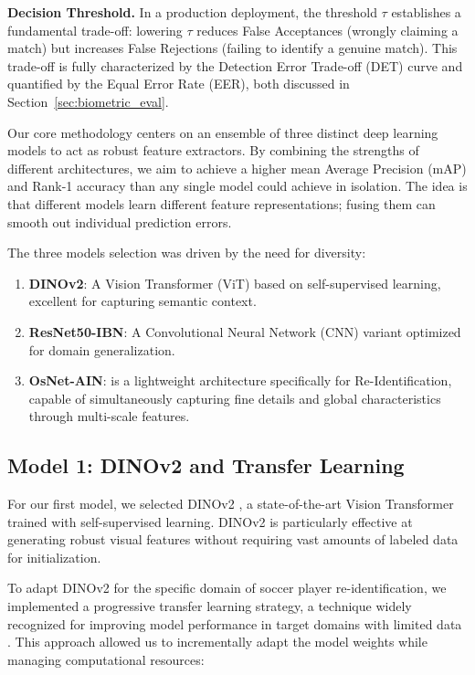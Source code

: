 \documentclass[10pt,twocolumn,letterpaper]{article}
\begin{document}
\textbf{Decision Threshold.} In a production deployment, the threshold $\tau$ establishes a fundamental trade-off: lowering $\tau$ reduces False Acceptances (wrongly claiming a match) but increases False Rejections (failing to identify a genuine match). This trade-off is fully characterized by the Detection Error Trade-off (DET) curve and quantified by the Equal Error Rate (EER), both discussed in Section~\ref{sec:biometric_eval}.

Our core methodology centers on an ensemble of three distinct deep learning models to act as robust feature extractors. By combining the strengths of different architectures, we aim to achieve a higher mean Average Precision (mAP) and Rank-1 accuracy than any single model could achieve in isolation. The idea is that different models learn different feature representations; fusing them can smooth out individual prediction errors.

The three models selection was driven by the need for diversity:
\begin{enumerate}
    \item \textbf{DINOv2}: A Vision Transformer (ViT) based on self-supervised learning, excellent for capturing semantic context.
    \item \textbf{ResNet50-IBN}: A Convolutional Neural Network (CNN) variant optimized for domain generalization.
    \item \textbf{OsNet-AIN}: is a lightweight architecture specifically for Re-Identification, capable of simultaneously capturing fine details and global characteristics through multi-scale features.
\end{enumerate}

\subsection{Model 1: DINOv2 and Transfer Learning}
For our first model, we selected DINOv2 \cite{dinov2}, a state-of-the-art Vision Transformer trained with self-supervised learning. DINOv2 is particularly effective at generating robust visual features without requiring vast amounts of labeled data for initialization.

To adapt DINOv2 for the specific domain of soccer player re-identification, we implemented a progressive transfer learning strategy, a technique widely recognized for improving model performance in target domains with limited data \cite{transfer_learning}. This approach allowed us to incrementally adapt the model weights while managing computational resources:
\end{document}
